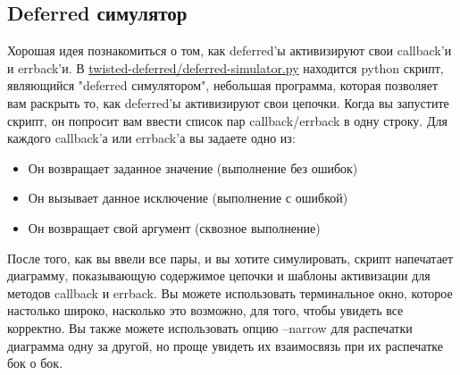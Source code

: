 \subsection{Deferred симулятор}

Хорошая идея познакомиться о том, как deferred'ы 
активизируют свои callback'и и errback'и. В 
\href{http://github.com/jdavisp3/twisted-intro/blob/master/twisted-deferred/deferred-simulator.py#L1}{twisted-deferred/deferred-simulator.py} 
находится python скрипт, являющийся "deferred симулятором", 
небольшая программа, которая позволяет вам 
раскрыть то, как deferred'ы активизируют свои цепочки. 
Когда вы запустите скрипт, он попросит вам ввести список пар 
callback/errback в одну строку. Для каждого callback'а или 
errback'а вы задаете одно из:

\begin{itemize}

\item Он возвращает заданное значение (выполнение без ошибок)

\item Он вызывает данное исключение (выполнение с ошибкой)

\item Он возвращает свой аргумент (сквозное выполнение)

\end{itemize}


После того, как вы ввели все пары, и вы хотите 
симулировать, скрипт напечатает диаграмму, показывающую 
содержимое цепочки и шаблоны активизации для методов 
callback и errback. Вы можете использовать терминальное 
окно, которое настолько широко, насколько это возможно, 
для того, чтобы увидеть все корректно. Вы также можете 
использовать опцию --narrow для распечатки диаграмма 
одну за другой, но проще увидеть их взаимосвязь при их 
распечатке бок о бок. 


